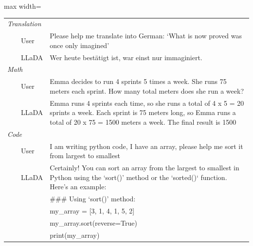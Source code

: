 \documentclass{article}
\begin{document}
\begin{table}[t!]
\begin{minipage}{0.99\textwidth}
{\begin{adjustbox}{max width=\textwidth}
\begin{tabular}{l p{12.5cm} }
\midrule
\emph{Translation} & \\ 
~~~~User & Please help me translate into German: `What is now proved was once only imagined' \\
~~~~LLaDA & Wer heute bestätigt ist, war einst nur immaginiert. \\

\midrule
\emph{Math} & \\ 
~~~~User & Emma decides to run 4 sprints 5 times a week. She runs 75 meters each sprint. How many total meters does she run a week? \\
~~~~LLaDA & Emma runs 4 sprints each time, so she runs a total of 4 x 5 = 20 sprints a week. Each sprint is 75 meters long, so Emma runs a total of 20 x 75 = 1500 meters a week. The final result is 1500 \\

\midrule
\emph{Code} & \\ 
~~~~User & I am writing python code, I have an array, please help me sort it from largest to smallest \\
~~~~LLaDA &Certainly! You can sort an array from the largest to smallest in Python using the `sort()' method or the `sorted()` function. Here's an example:\\
    & \#\#\# Using `sort()' method:\\
    & my\_array = [3, 1, 4, 1, 5, 2] \\
    & my\_array.sort(reverse=True) \\
    & print(my\_array) \\
\bottomrule
\end{tabular}
\end{adjustbox}
}
\end{minipage}
\end{table}
\end{document}
